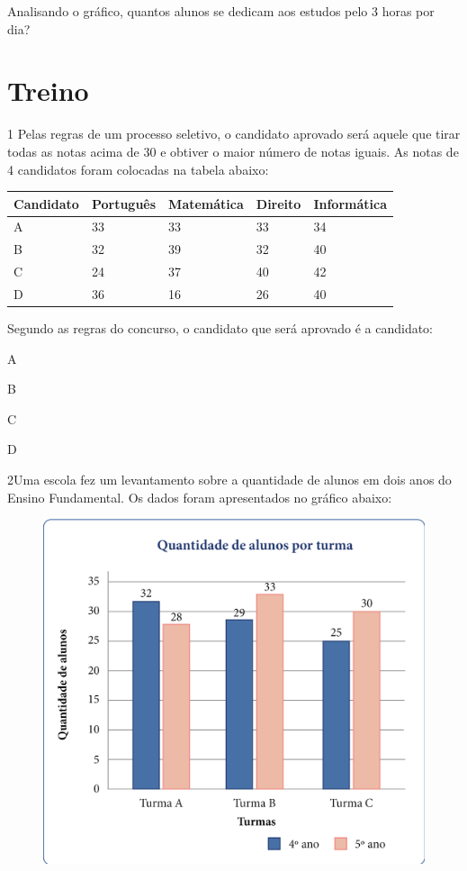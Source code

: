 Analisando o gráfico, quantos alunos se dedicam aos estudos pelo 3 horas
por dia?


\pagebreak
\section*{Treino}

\num{1} Pelas regras de um processo seletivo, o candidato aprovado
será aquele que tirar todas as notas acima de 30 e obtiver o
maior número de notas iguais. As notas de 4 candidatos foram colocadas
na tabela abaixo:

\begin{longtable}[]{@{}lllll@{}}
\toprule
Candidato & Português & Matemática & Direito &
Informática\tabularnewline
\midrule
\endhead
A & 33 & 33 & 33 & 34\tabularnewline
B & 32 & 39 & 32 & 40\tabularnewline
C & 24 & 37 & 40 & 42\tabularnewline
D & 36 & 16 & 26 & 40\tabularnewline
\bottomrule
\end{longtable}

Segundo as regras do concurso, o candidato que será aprovado é a
candidato:

\begin{minipage}{.5\textwidth}
\begin{escolha}
\item
  A
\item
  B
\item
  C
\item
  D
\end{escolha}
\end{minipage}


\pagebreak
\num{2}Uma escola fez um levantamento sobre a quantidade de alunos em dois
anos do Ensino Fundamental. Os dados foram apresentados no gráfico
abaixo:

\begin{figure}[htpb!]
\includegraphics[width=\textwidth]{../ilustracoes/MAT5/SAEB_5ANO_MAT_figura110.png}
\end{figure}

